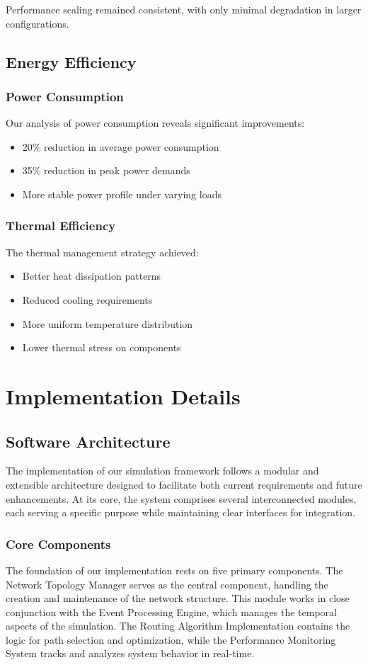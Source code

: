 \documentclass[12pt]{article}
\begin{document}
Performance scaling remained consistent, with only minimal degradation in larger configurations.

\subsection{Energy Efficiency}
\subsubsection{Power Consumption}
Our analysis of power consumption reveals significant improvements:
\begin{itemize}[noitemsep]
    \item 20\% reduction in average power consumption
    \item 35\% reduction in peak power demands
    \item More stable power profile under varying loads
\end{itemize}

\subsubsection{Thermal Efficiency}
The thermal management strategy achieved:
\begin{itemize}[noitemsep]
    \item Better heat dissipation patterns
    \item Reduced cooling requirements
    \item More uniform temperature distribution
    \item Lower thermal stress on components
\end{itemize}

\section{Implementation Details}
\subsection{Software Architecture}
The implementation of our simulation framework follows a modular and extensible architecture designed to facilitate both current requirements and future enhancements. At its core, the system comprises several interconnected modules, each serving a specific purpose while maintaining clear interfaces for integration.

\subsubsection{Core Components}
The foundation of our implementation rests on five primary components. The Network Topology Manager serves as the central component, handling the creation and maintenance of the network structure. This module works in close conjunction with the Event Processing Engine, which manages the temporal aspects of the simulation. The Routing Algorithm Implementation contains the logic for path selection and optimization, while the Performance Monitoring System tracks and analyzes system behavior in real-time.
\end{document}
